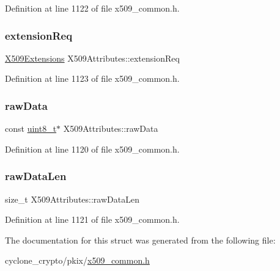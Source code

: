 Definition at line 1122 of file x509\+\_\+common.\+h.

\mbox{\label{structX509Attributes_a67c2453fe7c47efb38e5657346330316}} 
\subsubsection{\texorpdfstring{extension\+Req}{extensionReq}}
{\footnotesize\ttfamily \hyperlink{structX509Extensions}{X509\+Extensions} X509\+Attributes\+::extension\+Req}



Definition at line 1123 of file x509\+\_\+common.\+h.

\mbox{\label{structX509Attributes_a699798865f397343e8fa8ed260439422}} 
\subsubsection{\texorpdfstring{raw\+Data}{rawData}}
{\footnotesize\ttfamily const \hyperlink{stdint_8h_aba7bc1797add20fe3efdf37ced1182c5}{uint8\+\_\+t}$\ast$ X509\+Attributes\+::raw\+Data}



Definition at line 1120 of file x509\+\_\+common.\+h.

\mbox{\label{structX509Attributes_a27fd94a3c0cd628da8d60a9396f54f80}} 
\subsubsection{\texorpdfstring{raw\+Data\+Len}{rawDataLen}}
{\footnotesize\ttfamily size\+\_\+t X509\+Attributes\+::raw\+Data\+Len}



Definition at line 1121 of file x509\+\_\+common.\+h.



The documentation for this struct was generated from the following file\+:\begin{DoxyCompactItemize}
\item 
cyclone\+\_\+crypto/pkix/\hyperlink{pkix_2x509__common_8h}{x509\+\_\+common.\+h}\end{DoxyCompactItemize}
